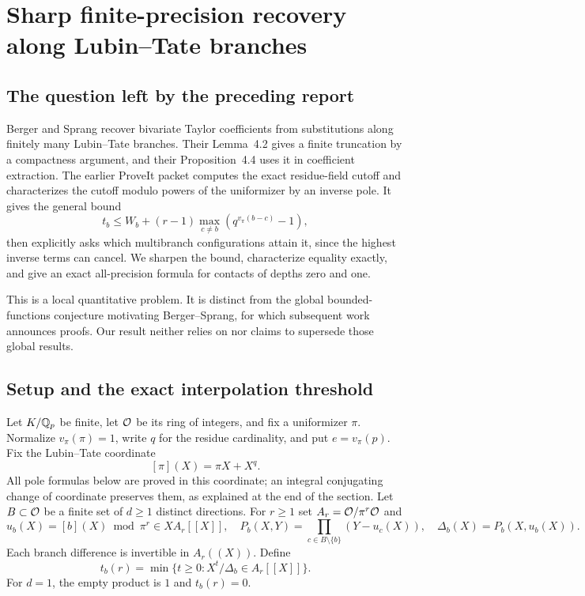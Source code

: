 \section{Sharp finite-precision recovery along Lubin--Tate branches}
\label{sec:jets}

\subsection{The question left by the preceding report}

Berger and Sprang recover bivariate Taylor coefficients from substitutions along finitely many Lubin--Tate branches. Their Lemma~4.2 gives a finite truncation by a compactness argument, and their Proposition~4.4 uses it in coefficient extraction.\cite{bergersprang}
The earlier ProveIt packet computes the exact residue-field cutoff and characterizes the cutoff modulo powers of the uniformizer by an inverse pole. It gives the general bound
\begin{equation}\label{eq:old-jet-bound}
 t_b\le W_b+(r-1)\max_{c\ne b}(q^{v_\pi(b-c)}-1),
\end{equation}
then explicitly asks which multibranch configurations attain it, since the highest inverse terms can cancel.\cite{priorjets}
We sharpen the bound, characterize equality exactly, and give an exact all-precision formula for contacts of depths zero and one.

This is a local quantitative problem. It is distinct from the global bounded-functions conjecture motivating Berger--Sprang, for which subsequent work announces proofs. Our result neither relies on nor claims to supersede those global results.\cite{bergersprang,colovic}

\subsection{Setup and the exact interpolation threshold}

Let $K/\mathbb Q_p$ be finite, let $\mathcal O$ be its ring of integers, and fix a uniformizer $\pi$. Normalize $v_\pi(\pi)=1$, write $q$ for the residue cardinality, and put $e=v_\pi(p)$. Fix the Lubin--Tate coordinate
\begin{equation}\label{eq:lt-coordinate}
 [\pi](X)=\pi X+X^q.
\end{equation}
All pole formulas below are proved in this coordinate; an integral conjugating change of coordinate preserves them, as explained at the end of the section.
Let $B\subset\mathcal O$ be a finite set of $d\ge1$ distinct directions. For $r\ge1$ set $A_r=\mathcal O/\pi^r\mathcal O$ and
\[
 u_b(X)=[b](X)\bmod\pi^r\in XA_r[[X]],\quad
 P_b(X,Y)=\prod_{c\in B\setminus\{b\}}(Y-u_c(X)),\quad
 \Delta_b(X)=P_b(X,u_b(X)).
\]
Each branch difference is invertible in $A_r((X))$. Define
\begin{equation}\label{eq:inverse-pole}
 t_b(r)=\min\{t\ge0:X^t/\Delta_b\in A_r[[X]]\}.
\end{equation}
For $d=1$, the empty product is $1$ and $t_b(r)=0$.

